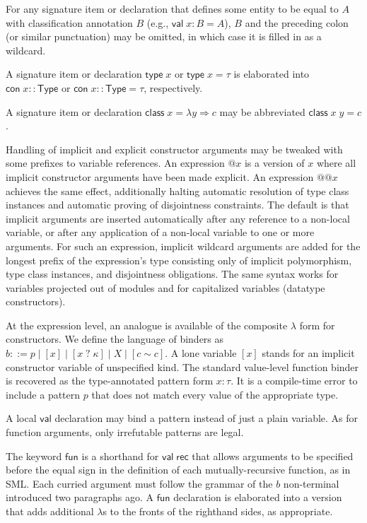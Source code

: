 \documentclass{article}
\newcommand{\mt}[1]{\mathsf{#1}}
\begin{document}
For any signature item or declaration that defines some entity to be equal to $A$ with classification annotation $B$ (e.g., $\mt{val} \; x : B = A$), $B$ and the preceding colon (or similar punctuation) may be omitted, in which case it is filled in as a wildcard.

A signature item or declaration $\mt{type} \; x$ or $\mt{type} \; x = \tau$ is elaborated into $\mt{con} \; x :: \mt{Type}$ or $\mt{con} \; x :: \mt{Type} = \tau$, respectively.

A signature item or declaration $\mt{class} \; x = \lambda y \Rightarrow c$ may be abbreviated $\mt{class} \; x \; y = c$.

Handling of implicit and explicit constructor arguments may be tweaked with some prefixes to variable references.  An expression $@x$ is a version of $x$ where all implicit constructor arguments have been made explicit.  An expression $@@x$ achieves the same effect, additionally halting automatic resolution of type class instances and automatic proving of disjointness constraints.  The default is that implicit arguments are inserted automatically after any reference to a non-local variable, or after any application of a non-local variable to one or more arguments.  For such an expression, implicit wildcard arguments are added for the longest prefix of the expression's type consisting only of implicit polymorphism, type class instances, and disjointness obligations.  The same syntax works for variables projected out of modules and for capitalized variables (datatype constructors).

At the expression level, an analogue is available of the composite $\lambda$ form for constructors.  We define the language of binders as $b ::= p \mid [x] \mid [x \; ? \; \kappa] \mid X \mid [c \sim c]$.  A lone variable $[x]$ stands for an implicit constructor variable of unspecified kind.  The standard value-level function binder is recovered as the type-annotated pattern form $x : \tau$.  It is a compile-time error to include a pattern $p$ that does not match every value of the appropriate type.

A local $\mt{val}$ declaration may bind a pattern instead of just a plain variable.  As for function arguments, only irrefutable patterns are legal.

The keyword $\mt{fun}$ is a shorthand for $\mt{val} \; \mt{rec}$ that allows arguments to be specified before the equal sign in the definition of each mutually-recursive function, as in SML.  Each curried argument must follow the grammar of the $b$ non-terminal introduced two paragraphs ago.  A $\mt{fun}$ declaration is elaborated into a version that adds additional $\lambda$s to the fronts of the righthand sides, as appropriate.
\end{document}
